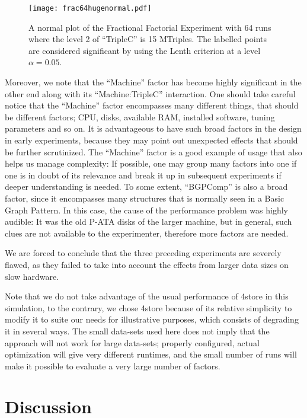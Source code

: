 \documentclass{llncs}
\begin{document}
\begin{figure}[h!]
  \texttt{[image: frac64hugenormal.pdf]}
  \caption{A normal plot of the Fractional Factorial Experiment with
    64 runs where the level 2 of ``TripleC'' is 15 MTriples. The
    labelled points are considered significant by using the Lenth
    criterion at a level $\alpha=0.05$.}\label{fig:frac64hugenormal}
\end{figure}


Moreover, we note that the ``Machine'' factor has become highly
significant in the other end along with its ``Machine:TripleC''
interaction. One should take careful notice that the ``Machine''
factor encompasses many different things, that should be different
factors; CPU, disks, available RAM, installed software, tuning
parameters and so on. It is advantageous to have such broad factors in
the design in early experiments, because they may point out unexpected
effects that should be further scrutinized. The ``Machine'' factor is
a good example of usage that also helps us manage complexity: If
possible, one may group many factors into one if one is in doubt of
its relevance and break it up in subsequent experiments if deeper
understanding is needed. To some extent, ``BGPComp'' is also a broad
factor, since it encompasses many structures that is normally seen in
a Basic Graph Pattern. In this case, the cause of the performance
problem was highly audible: It was the old P-ATA disks of the larger
machine, but in general, such clues are not available to the
experimenter, therefore more factors are needed.

We are forced to conclude that the three preceding experiments are
severely flawed, as they failed to take into account the effects from
larger data sizes on slow hardware.


Note that we do not take advantage of the usual performance of 4store
in this simulation, to the contrary, we chose 4store because of its
relative simplicity to modify it to suite our needs for illustrative
purposes, which consists of degrading it in several ways. The small
data-sets used here does not imply that the approach will not work for
large data-sets; properly configured, actual optimization will give
very different runtimes, and the small number of runs will make it
possible to evaluate a very large number of factors.



\section{Discussion}
\end{document}
